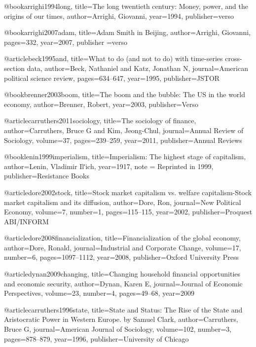 @book{arrighi1994long,
  title={The long twentieth century: Money, power, and the origins of our times},
  author={Arrighi, Giovanni},
  year={1994},
  publisher={verso}
}

@book{arrighi2007adam,
  title={Adam Smith in Beijing},
  author={Arrighi, Giovanni},
  pages={332},
  year={2007},
  publisher ={verso}
}

@article{beck1995and,
  title={What to do (and not to do) with time-series cross-section data},
  author={Beck, Nathaniel and Katz, Jonathan N},
  journal={American political science review},
  pages={634--647},
  year={1995},
  publisher={JSTOR}
}

@book{brenner2003boom,
  title={The boom and the bubble: The US in the world economy},
  author={Brenner, Robert},
  year={2003},
  publisher={Verso}
}

@article{carruthers2011sociology,
  title={The sociology of finance},
  author={Carruthers, Bruce G and Kim, Jeong-Chul},
  journal={Annual Review of Sociology},
  volume={37},
  pages={239--259},
  year={2011},
  publisher={Annual Reviews}
}

@book{lenin1999imperialism,
  title={Imperialism: The highest stage of capitalism},
  author={Lenin, Vladimir Ilʹich},
  year={1917},
  note = {Reprinted in 1999},
  publisher={Resistance Books}
}

@article{dore2002stock,
  title={Stock market capitalism vs. welfare capitalism-Stock market capitalism and its diffusion},
  author={Dore, Ron},
  journal={New Political Economy},
  volume={7},
  number={1},
  pages={115--115},
  year={2002},
  publisher={Proquest ABI/INFORM}
}

@article{dore2008financialization,
  title={Financialization of the global economy},
  author={Dore, Ronald},
  journal={Industrial and Corporate Change},
  volume={17},
  number={6},
  pages={1097--1112},
  year={2008},
  publisher={Oxford University Press}
}

@article{dynan2009changing,
  title={Changing household financial opportunities and economic security},
  author={Dynan, Karen E},
  journal={Journal of Economic Perspectives},
  volume={23},
  number={4},
  pages={49--68},
  year={2009}
}

@article{carruthers1996state,
  title={State and Status: The Rise of the State and Aristocratic Power in Western Europe. by Samuel Clark},
  author={Carruthers, Bruce G},
  journal={American Journal of Sociology},
  volume={102},
  number={3},
  pages={878--879},
  year={1996},
  publisher={University of Chicago}
}

